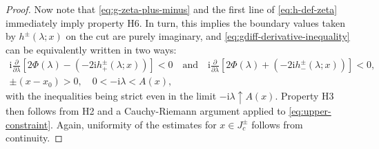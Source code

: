\documentclass[12pt]{amsart}
\numberwithin{equation}{section}
\newcommand{\ii}{\mathrm{i}}
\newcommand{\SP}{\lambda}
\newcommand{\phaseint}{\Phi}
\begin{document}
\begin{proof}
Now note that \eqref{eq:g-zeta-plus-minus} and the first line of \eqref{eq:h-def-zeta} immediately imply property H6.  
In turn, this implies the boundary values taken by $h^\pm(\SP;x)$ on the cut are purely imaginary, and \eqref{eq:gdiff-derivative-inequality} can be equivalently written in two ways:
\begin{multline}
\ii\frac{\partial}{\partial\SP}\left[2\phaseint(\SP)-(-2\ii h_+^\pm(\SP;x))\right]<0\quad\text{and}\quad
\ii\frac{\partial}{\partial\SP}\left[2\phaseint(\SP)+(-2\ii h_-^\pm(\SP;x))\right]<0,\\ \pm(x-x_0)>0,\quad 0<-\ii\SP<A(x),
\label{eq:upper-constraint}
\end{multline}
with the inequalities being strict even in the limit $-\ii\SP\uparrow A(x)$.  
Property H3 then follows from H2 and a Cauchy-Riemann argument applied to \eqref{eq:upper-constraint}.  Again, uniformity of the estimates for $x\in J_c^\pm$ follows from continuity.  


\end{proof}
\end{document}
